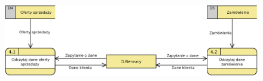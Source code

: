 	\begin{figure}[H]
		\centering
		\centerline{\includegraphics[width=1.1\textwidth]{img/DFD/2-level-kierowcy.eps}}
	\end{figure}

